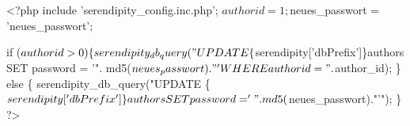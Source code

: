 \begin{ospcode}
<?php 
include 'serendipity_config.inc.php';
$authorid = 1;
$neues_passwort = 'neues_passwort';

if ($authorid > 0) \{
    serendipity_db_query("UPDATE \{$serendipity['dbPrefix']\}authors 
                             SET password = '". md5($neues_passwort)."'
                           WHERE authorid = ". $author_id);
\} else \{
    serendipity_db_query("UPDATE \{$serendipity['dbPrefix']\}authors 
                             SET password = '".md5($neues_passwort)."'");
\}
?>
\end{ospcode}